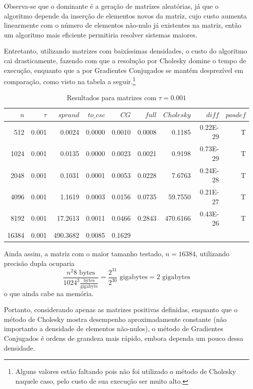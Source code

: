 \documentclass[a4paper,11pt]{article}
\begin{document}
      Observa-se que o dominante é a geração de matrizes aleatórias, já que o algoritmo depende da inserção
      de elementos novos da matriz, cujo custo aumenta linearmente com o número de elementos não-nulo já existentes
      na matriz, então um algoritmo mais eficiente permitiria resolver sistemas maiores.

      \newpage
      Entretanto, utilizando matrizes com baixíssimas densidades, o custo do algoritmo cai drasticamente, fazendo
      com que a resolução por Cholesky domine o tempo de execução, enquanto que a por Gradientes Conjugados se mantém
      desprezível em comparação, como visto na tabela a seguir.\footnote{Alguns valores estão faltando pois não foi utilizado o método
      de Cholesky naquele caso, pelo custo de sua execução ser muito alto.}

      \begin{table}[h]
        \caption{Resultados para matrizes com $\tau = 0.001$}
        \centering
        \begin{tabular}{rrrrrrrrr}
            $n$ & $\tau$  & $sprand$ & $to\_csc$ & $CG$ & $full$ & $Cholesky$ & $diff$ & $posdef$\\
            \hline
            512  & 0.001 &  0.0024 & 0.0000 & 0.0010 & 0.0008 &   0.1185 & 0.22E-29 & T \\
            1024 & 0.001 &  0.0135 & 0.0000 & 0.0023 & 0.0021 &   0.9198 & 0.73E-29 & T \\
            2048 & 0.001 &  0.1031 & 0.0001 & 0.0053 & 0.0228 &   7.6763 & 0.24E-28 & T \\
            4096 & 0.001 &  1.1619 & 0.0003 & 0.0156 & 0.0735 &  59.7550 & 0.21E-27 & T \\
            8192 & 0.001 & 17.2613 & 0.0011 & 0.0466 & 0.2843 & 470.6166 & 0.43E-26 & T \\
            16384 & 0.001 & 490.3682 & 0.0085 & 0.1629  & & & & \\
        \end{tabular}
      \end{table}

      Ainda assim, a matriz com o maior tamanho testado, $n = 16384$, utilizando precisão dupla ocuparia
      $$ \frac{n^2 8\text{ bytes}}{1024^3 \frac{\text{bytes}}{\text{gigabyte}}} = \frac{2^{31}}{2^{30}} \text{ gigabytes} = 2 \text{ gigabytes} $$
      o que ainda cabe na memória.

      Portanto, considerando apenas as matrizes positivas definidas, enquanto que o método de Cholesky mostra desempenho
      aproximadamente constante (não importanto a densidade de elementos não-nulos), o método de Gradientes Conjugados é
      ordens de grandeza mais rápido, embora dependa um pouco dessa densidade.
\end{document}
